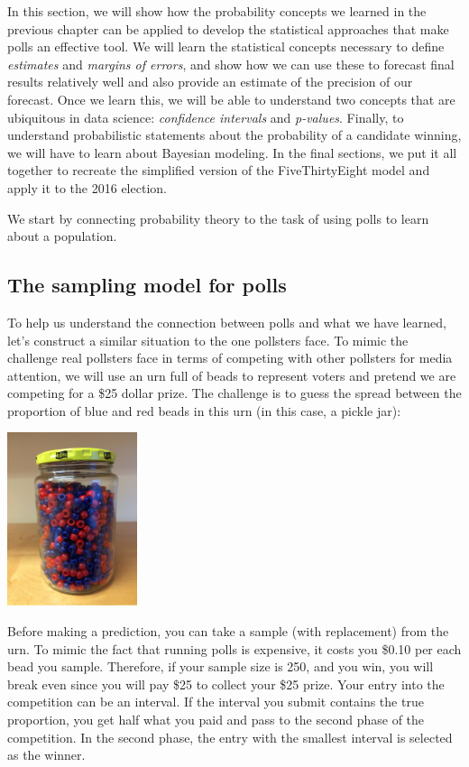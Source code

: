 \documentclass[openany]{book}
\begin{document}
In this section, we will show how the probability concepts we learned in the previous chapter can be applied to develop the statistical approaches that make polls an effective tool. We will learn the statistical concepts necessary to define \emph{estimates} and \emph{margins of errors}, and show how we can use these to forecast final results relatively well and also provide an estimate of the precision of our forecast. Once we learn this, we will be able to understand two concepts that are ubiquitous in data science: \emph{confidence intervals} and \emph{p-values}. Finally, to understand probabilistic statements about the probability of a candidate winning, we will have to learn about Bayesian modeling. In the final sections, we put it all together to recreate the simplified version of the FiveThirtyEight model and apply it to the 2016 election.

We start by connecting probability theory to the task of using polls to learn about a population.

\hypertarget{the-sampling-model-for-polls}{%
\subsection{The sampling model for polls}\label{the-sampling-model-for-polls}}

To help us understand the connection between polls and what we have learned, let's construct a similar situation to the one pollsters face. To mimic the challenge real pollsters face in terms of competing with other pollsters for media attention, we will use an urn full of beads to represent voters and pretend we are competing for a \$25 dollar prize. The challenge is to guess the spread between the proportion of blue and red beads in this urn (in this case, a pickle jar):

\begin{center}\includegraphics[width=1.5in]{inference/img//urn} \end{center}

Before making a prediction, you can take a sample (with replacement) from the urn. To mimic the fact that running polls is expensive, it costs you \$0.10 per each bead you sample. Therefore, if your sample size is 250, and you win, you will break even since you will pay \$25 to collect your \$25 prize. Your entry into the competition can be an interval. If the interval you submit contains the true proportion, you get half what you paid and pass to the second phase of the competition. In the second phase, the entry with the smallest interval is selected as the winner.
\end{document}

